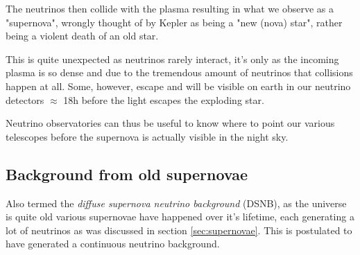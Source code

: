 The neutrinos then collide with the plasma resulting in what we observe as a
"supernova", wrongly thought of by Kepler as being a "new (nova) star", rather
being a violent death of an old star.

This is quite unexpected as neutrinos rarely interact, it's only as the
incoming plasma is so dense and due to the tremendous amount of neutrinos that
collisions happen at all. Some, however, escape and will be visible on earth
in our neutrino detectors $\approx$ 18h before the light escapes the exploding
star.

Neutrino observatories can thus be useful to know where to point our various
telescopes before the supernova is actually visible in the night sky.
\subsection{Background from old supernovae}
Also termed the \textit{diffuse supernova neutrino background} (DSNB), as the
universe is quite old various supernovae have happened over it's lifetime, each generating
a lot of neutrinos as was discussed in section \ref{sec:supernovae}. 
This is postulated to have generated a continuous neutrino background\cite{Beacom_2010}.

